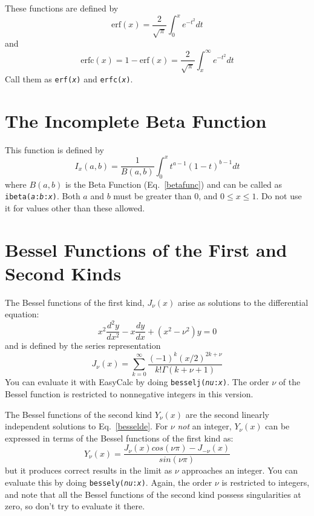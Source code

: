 \documentclass{article}
\begin{document}
These functions are defined by
\begin{equation}
\mathrm{erf}(x) = \frac{2}{\sqrt{\pi}}\int_0^x e^{-t^2} dt
\end{equation}
and
\begin{equation}
\mathrm{erfc}(x) = 1 - \mathrm{erf}(x) =
\frac{2}{\sqrt{\pi}}\int_x^\infty e^{-t^2} dt
\end{equation}
Call them as \texttt{erf(\textsl{x})} and \texttt{erfc(\textsl{x})}.

\section*{The Incomplete Beta Function}

This function is defined by
\begin{equation}
I_x(a, b) = \frac{1}{B(a, b)} \int_0^x t^{a-1}(1-t)^{b-1} dt
\end{equation}
where $B(a, b)$ is the Beta Function (Eq.~\ref{betafunc}) and can
be called as \texttt{ibeta(\textsl{a}:\textsl{b}:\textsl{x})}.  Both
$a$ and $b$ must be greater than 0, and $0 \le x \le 1$.  Do not use
it for values other than these allowed.

\section*{Bessel Functions of the First and Second Kinds}

The Bessel functions of the first kind, $J_\nu(x)$ arise as
solutions to the differential equation:
\begin{equation}
\label{besselde}
x^2\frac{d^2y}{dx^2} - x\frac{dy}{dx} + (x^2 - \nu^2)y = 0
\end{equation}
and is defined by the series representation
\begin{equation}
J_\nu(x) = \sum^\infty_{k=0}\frac{(-1)^k(x/2)^{2k+\nu}}{k!\Gamma(k + \nu
 +1)}
\end{equation}
You can evaluate it with EasyCalc by doing
\texttt{besselj(\textsl{nu}:\textsl{x})}.  The order $\nu$ of the
Bessel function is restricted to nonnegative integers in this
version.

The Bessel functions of the second kind $Y_\nu(x)$ are the second
linearly independent solutions to Eq.~\ref{besselde}.  For $\nu$
\emph{not} an integer, $Y_\nu(x)$ can be expressed in terms of the
Bessel functions of the first kind as:
\begin{equation}
Y_\nu(x) = \frac{J_\nu(x) cos(\nu\pi) - J_{-\nu}(x)}{sin(\nu\pi)}
\end{equation}
but it produces correct results in the limit as $\nu$ approaches an
integer.  You can evaluate this by doing
\texttt{bessely(\textsl{nu}:\textsl{x})}.  Again, the order $\nu$ is
restricted to integers, and note that all the Bessel functions of the
second kind possess singularities at zero, so don't try to evaluate it
there.
\end{document}
